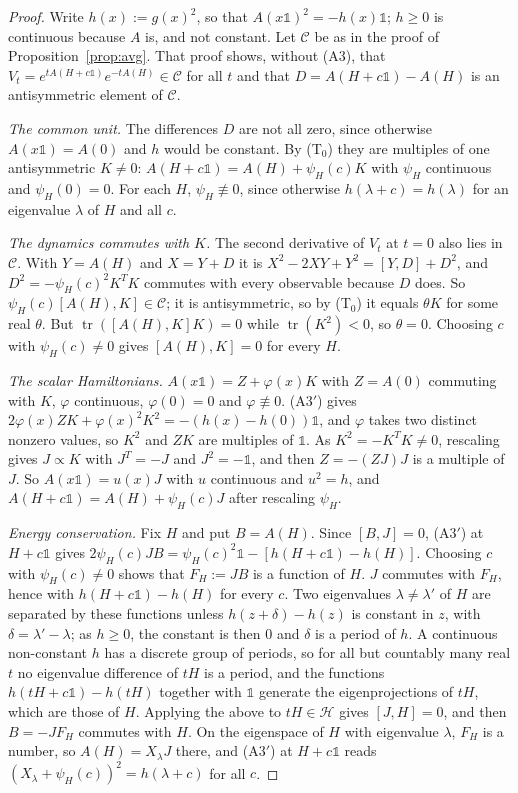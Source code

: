 \documentclass[11pt]{article}
\theoremstyle{remark}
\newcommand{\one}{\mathbb{1}}
\newcommand{\tr}{\operatorname{tr}}
\begin{document}
\begin{proof}
Write $h(x):=g(x)^2$, so that $A(x\one)^2=-h(x)\one$; $h\ge0$ is continuous because $A$ is, and not constant. Let $\mathcal{C}$ be as in the proof of Proposition~\ref{prop:avg}. That proof shows, without (A3), that $V_t=e^{tA(H+c\one)}e^{-tA(H)}\in\mathcal{C}$ for all $t$ and that $D=A(H+c\one)-A(H)$ is an antisymmetric element of $\mathcal{C}$.

\emph{The common unit.} The differences $D$ are not all zero, since otherwise $A(x\one)=A(0)$ and $h$ would be constant. By (T$_0$) they are multiples of one antisymmetric $K\neq0$: $A(H+c\one)=A(H)+\psi_H(c)K$ with $\psi_H$ continuous and $\psi_H(0)=0$. For each $H$, $\psi_H\not\equiv0$, since otherwise $h(\lambda+c)=h(\lambda)$ for an eigenvalue $\lambda$ of $H$ and all $c$.

\emph{The dynamics commutes with $K$.} The second derivative of $V_t$ at $t=0$ also lies in $\mathcal{C}$. With $Y=A(H)$ and $X=Y+D$ it is $X^2-2XY+Y^2=[Y,D]+D^2$, and $D^2=-\psi_H(c)^2K^TK$ commutes with every observable because $D$ does. So $\psi_H(c)[A(H),K]\in\mathcal{C}$; it is antisymmetric, so by (T$_0$) it equals $\theta K$ for some real $\theta$. But $\tr([A(H),K]K)=0$ while $\tr(K^2)<0$, so $\theta=0$. Choosing $c$ with $\psi_H(c)\neq0$ gives $[A(H),K]=0$ for every $H$.

\emph{The scalar Hamiltonians.} $A(x\one)=Z+\varphi(x)K$ with $Z=A(0)$ commuting with $K$, $\varphi$ continuous, $\varphi(0)=0$ and $\varphi\not\equiv0$. (A3$'$) gives $2\varphi(x)ZK+\varphi(x)^2K^2=-(h(x)-h(0))\one$, and $\varphi$ takes two distinct nonzero values, so $K^2$ and $ZK$ are multiples of $\one$. As $K^2=-K^TK\neq0$, rescaling gives $J\propto K$ with $J^T=-J$ and $J^2=-\one$, and then $Z=-(ZJ)J$ is a multiple of $J$. So $A(x\one)=u(x)J$ with $u$ continuous and $u^2=h$, and $A(H+c\one)=A(H)+\psi_H(c)J$ after rescaling $\psi_H$.

\emph{Energy conservation.} Fix $H$ and put $B=A(H)$. Since $[B,J]=0$, (A3$'$) at $H+c\one$ gives $2\psi_H(c)JB=\psi_H(c)^2\one-[h(H+c\one)-h(H)]$. Choosing $c$ with $\psi_H(c)\neq0$ shows that $F_H:=JB$ is a function of $H$. $J$ commutes with $F_H$, hence with $h(H+c\one)-h(H)$ for every $c$. Two eigenvalues $\lambda\neq\lambda'$ of $H$ are separated by these functions unless $h(z+\delta)-h(z)$ is constant in $z$, with $\delta=\lambda'-\lambda$; as $h\ge0$, the constant is then $0$ and $\delta$ is a period of $h$. A continuous non-constant $h$ has a discrete group of periods, so for all but countably many real $t$ no eigenvalue difference of $tH$ is a period, and the functions $h(tH+c\one)-h(tH)$ together with $\one$ generate the eigenprojections of $tH$, which are those of $H$. Applying the above to $tH\in\mathcal{H}$ gives $[J,H]=0$, and then $B=-JF_H$ commutes with $H$. On the eigenspace of $H$ with eigenvalue $\lambda$, $F_H$ is a number, so $A(H)=X_\lambda J$ there, and (A3$'$) at $H+c\one$ reads $(X_\lambda+\psi_H(c))^2=h(\lambda+c)$ for all $c$.


\end{proof}
\end{document}
